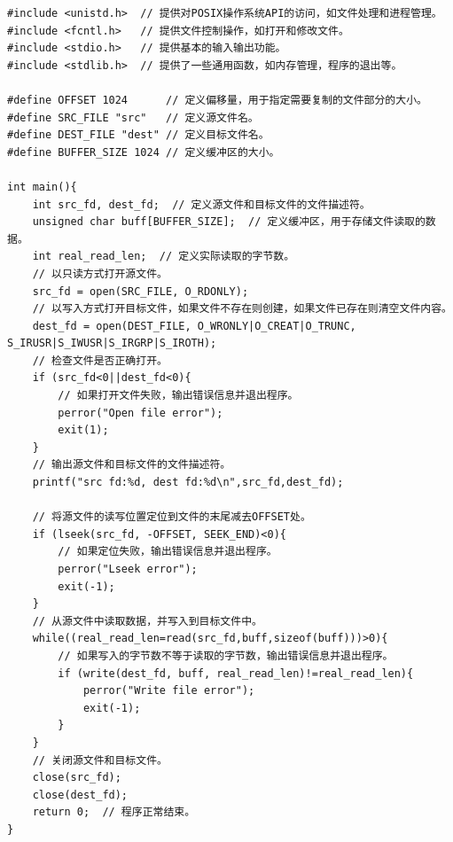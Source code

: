 \documentclass[12pt, a4paper, oneside]{ctexbook}
\numberwithin{figure}{section}
\begin{document}
\begin{verbatim}
#include <unistd.h>  // 提供对POSIX操作系统API的访问，如文件处理和进程管理。
#include <fcntl.h>   // 提供文件控制操作，如打开和修改文件。
#include <stdio.h>   // 提供基本的输入输出功能。
#include <stdlib.h>  // 提供了一些通用函数，如内存管理，程序的退出等。

#define OFFSET 1024      // 定义偏移量，用于指定需要复制的文件部分的大小。
#define SRC_FILE "src"   // 定义源文件名。
#define DEST_FILE "dest" // 定义目标文件名。
#define BUFFER_SIZE 1024 // 定义缓冲区的大小。

int main(){
    int src_fd, dest_fd;  // 定义源文件和目标文件的文件描述符。
    unsigned char buff[BUFFER_SIZE];  // 定义缓冲区，用于存储文件读取的数据。
    int real_read_len;  // 定义实际读取的字节数。
    // 以只读方式打开源文件。
    src_fd = open(SRC_FILE, O_RDONLY);
    // 以写入方式打开目标文件，如果文件不存在则创建，如果文件已存在则清空文件内容。
    dest_fd = open(DEST_FILE, O_WRONLY|O_CREAT|O_TRUNC, S_IRUSR|S_IWUSR|S_IRGRP|S_IROTH);
    // 检查文件是否正确打开。
    if (src_fd<0||dest_fd<0){
        // 如果打开文件失败，输出错误信息并退出程序。
        perror("Open file error");
        exit(1);
    }
    // 输出源文件和目标文件的文件描述符。
    printf("src fd:%d, dest fd:%d\n",src_fd,dest_fd);

    // 将源文件的读写位置定位到文件的末尾减去OFFSET处。
    if (lseek(src_fd, -OFFSET, SEEK_END)<0){
        // 如果定位失败，输出错误信息并退出程序。
        perror("Lseek error");
        exit(-1);
    }
    // 从源文件中读取数据，并写入到目标文件中。
    while((real_read_len=read(src_fd,buff,sizeof(buff)))>0){
        // 如果写入的字节数不等于读取的字节数，输出错误信息并退出程序。
        if (write(dest_fd, buff, real_read_len)!=real_read_len){
            perror("Write file error");
            exit(-1);
        }
    }        
    // 关闭源文件和目标文件。
    close(src_fd);
    close(dest_fd);
    return 0;  // 程序正常结束。
}

\end{verbatim}
\end{document}
